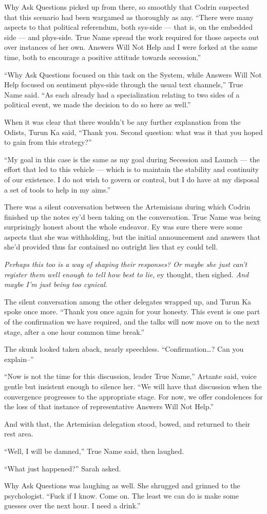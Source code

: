 Why Ask Questions picked up from there, so smoothly that Codrin suspected that this scenario had been wargamed as thoroughly as any. ``There were many aspects to that political referendum, both sys-side — that is, on the embedded side — and phys-side. True Name spread the work required for those aspects out over instances of her own. Answers Will Not Help and I were forked at the same time, both to encourage a positive attitude towards secession.''

``Why Ask Questions focused on this task on the System, while Answers Will Not Help focused on sentiment phys-side through the usual text channels,'' True Name said. ``As each already had a specialization relating to two sides of a political event, we made the decision to do so here as well.''

When it was clear that there wouldn't be any further explanation from the Odists, Turun Ka said, ``Thank you. Second question: what was it that you hoped to gain from this strategy?''

``My goal in this case is the same as my goal during Secession and Launch — the effort that led to this vehicle — which is to maintain the stability and continuity of our existence. I do not wish to govern or control, but I do have at my disposal a set of tools to help in my aims.''

There was a silent conversation between the Artemisians during which Codrin finished up the notes ey'd been taking on the conversation. True Name was being surprisingly honest about the whole endeavor. Ey was sure there were some aspects that she was withholding, but the initial announcement and answers that she'd provided thus far contained no outright lies that ey could tell.

\emph{Perhaps this too is a way of shaping their responses? Or maybe she just can't register them well enough to tell how best to lie,} ey thought, then sighed. \emph{And maybe I'm just being too cynical.}

The silent conversation among the other delegates wrapped up, and Turun Ka spoke once more. ``Thank you once again for your honesty. This event is one part of the confirmation we have required, and the talks will now move on to the next stage, after a one hour common time break.''

The skunk looked taken aback, nearly speechless. ``Confirmation\ldots? Can you explain--''

``Now is not the time for this discussion, leader True Name,'' Artante said, voice gentle but insistent enough to silence her. ``We will have that discussion when the convergence progresses to the appropriate stage. For now, we offer condolences for the loss of that instance of representative Answers Will Not Help.''

And with that, the Artemisian delegation stood, bowed, and returned to their rest area.

``Well, I will be damned,'' True Name said, then laughed.

``What just happened?'' Sarah asked.

Why Ask Questions was laughing as well. She shrugged and grinned to the psychologist. ``Fuck if I know. Come on. The least we can do is make some guesses over the next hour. I need a drink.''
